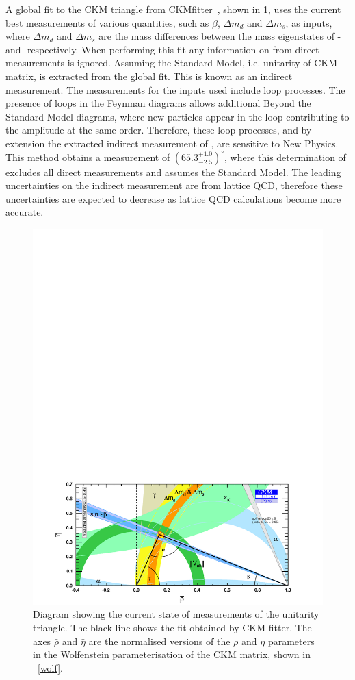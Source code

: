 A global fit to the CKM triangle from CKMfitter~\cite{CKMFitter}, shown in \fig\ref{globalfit}, uses the current best measurements of various quantities, such as $\beta$, $\Delta m_d$ and $\Delta m_s$, as inputs, where $\Delta m_d$ and $\Delta m_s$ are the mass differences between the mass eigenstates of \Bz-\Bzb and \Bs-\Bsb respectively. When performing this fit any information on \Pgamma from direct measurements is ignored. Assuming the Standard Model, i.e. unitarity of CKM matrix, \Pgamma is extracted from the global fit. This is known as an indirect measurement. The measurements for the inputs used include loop processes. The presence of loops in the Feynman diagrams allows additional Beyond the Standard Model diagrams, where new particles appear in the loop contributing to the amplitude at the same order. Therefore, these loop processes, and by extension the extracted indirect measurement of \Pgamma, are sensitive to New Physics. This method obtains a \Pgamma measurement of $(65.3^{+1.0}_{-2.5})^{\circ}$, where this determination of \Pgamma excludes all direct measurements and assumes the Standard Model. The leading uncertainties on the indirect measurement are from lattice QCD, therefore these uncertainties are expected to decrease as lattice QCD calculations become more accurate. 
\begin{figure}[!ht]
\centering
\includegraphics[trim = 0mm 0mm 0mm 180mm,clip,width=0.9\linewidth]{figures/theory/rhoeta_small_global.pdf}
\caption{Diagram showing the current state of measurements of the unitarity triangle. The black line shows the fit obtained by CKM fitter. The axes $\bar{\rho}$ and $\bar{\eta}$ are the normalised versions of the $\rho$ and $\eta$ parameters in the Wolfenstein parameterisation of the CKM matrix, shown in \eqn~\ref{wolf}.}
\label{globalfit}
\end{figure}

